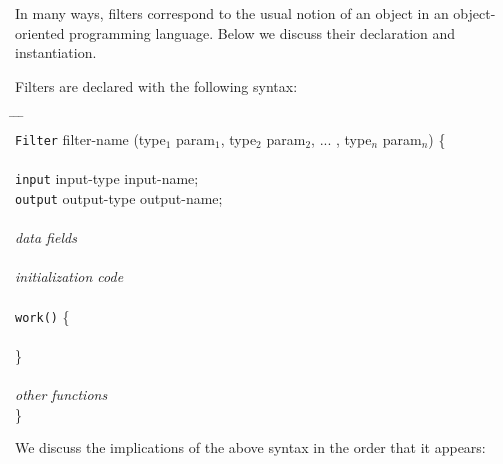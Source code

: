 \documentclass[draft]{article}
\begin{document}
In many ways, filters correspond to the usual notion of an object in
an object-oriented programming language.  Below we discuss their
declaration and instantiation.

\medskip
{}
\medskip

Filters are declared with the following syntax:

\begin{tabbing}
\hspace{0.2in} \= \hspace{0.2in} \= \hspace{0.2in} \= \hspace{0.2in} \= \\

{\tt Filter} filter-name (type$_1$ param$_1$, type$_2$ param$_2$,
... , type$_n$ param$_n$) \{ \\ \\

\> {\tt input} input-type input-name; \\
\> {\tt output} output-type output-name; \\ \\

\> {\it data fields} \\ \\

\> {\it initialization code} \\ \\

\> {\tt work()} \{ \\ \\
\> \} \\ \\

\> {\it other functions} \\

\}
\end{tabbing}

We discuss the implications of the above syntax in the order that it
appears:
\end{document}
